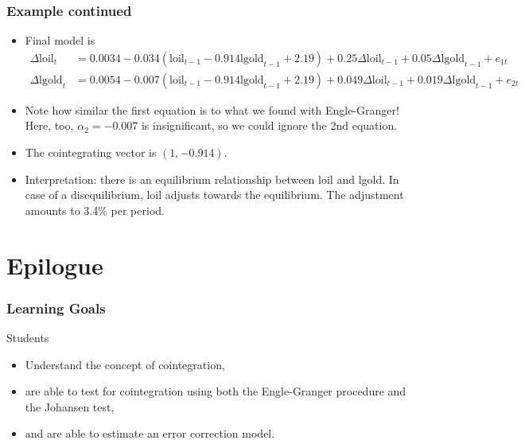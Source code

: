 \begin{frame}\frametitle{Example continued}
\begin{itemize}
\item Final model is
{\tiny
\begin{align*}
\Delta \textrm{loil}_t&=0.0034-0.034(\textrm{loil}_{t-1}-0.914\textrm{lgold}_{t-1}+2.19)+0.25\Delta\textrm{loil}_{t-1}+0.05\Delta\textrm{lgold}_{t-1}+e_{1t}\\
\Delta \textrm{lgold}_t&=0.0054-0.007(\textrm{loil}_{t-1}-0.914\textrm{lgold}_{t-1}+2.19)+0.049\Delta\textrm{loil}_{t-1}+0.019\Delta\textrm{lgold}_{t-1}+e_{2t}
\end{align*}}
\item Note how similar the first equation is to what we found with Engle-Granger! Here, too, $\alpha_2=-0.007$ is insignificant, so we could ignore the 2nd equation.
\item The cointegrating vector is $(1, -0.914)$.
\item Interpretation: there is an equilibrium relationship between \textrm{loil} and \textrm{lgold}. In case of a disequilibrium, \textrm{loil} adjusts towards the equilibrium. The adjustment amounts to 3.4\% per period.
\end{itemize}
\end{frame}
\section{Epilogue}
\begin{frame}
\frametitle{Learning Goals}
Students
\begin{itemize}
\item Understand the concept of cointegration,
\item are able to test for cointegration using both the Engle-Granger procedure and the Johansen test,
\item and are able to estimate an error correction model.
\end{itemize}
\end{frame}

